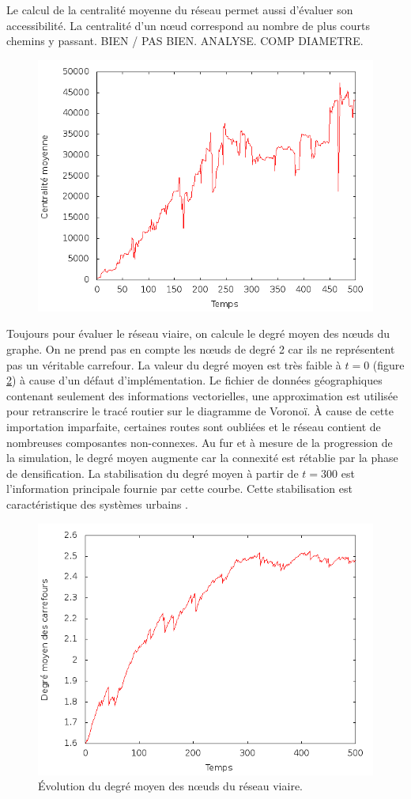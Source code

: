 \documentclass[10pt]{article}
\begin{document}
Le calcul de la centralité moyenne du réseau permet aussi d'évaluer
son accessibilité. La centralité d'un n\oe ud correspond au nombre de
plus courts chemins y passant. BIEN / PAS BIEN. ANALYSE. COMP
DIAMETRE.

\begin{figure}[H]
  \centering
  \includegraphics[width=.8\linewidth]{images/centrality.png}
  \caption{}
    \label{fig:centrality}
\end{figure}

Toujours pour évaluer le réseau viaire, on calcule le degré moyen des
n\oe uds du graphe. On ne prend pas en compte les n\oe uds de degré 2
car ils ne représentent pas un véritable carrefour. La valeur du degré
moyen est très faible à $t = 0$ (figure \ref{fig:degree}) à cause d'un
défaut d'implémentation. Le fichier de données géographiques contenant
seulement des informations vectorielles, une approximation est
utilisée pour retranscrire le tracé routier sur le diagramme de
Voronoï. À cause de cette importation imparfaite, certaines routes
sont oubliées et le réseau contient de nombreuses composantes
non-connexes. Au fur et à mesure de la progression de la simulation,
le degré moyen augmente car la connexité est rétablie par la phase de
densification. La stabilisation du degré moyen à partir de $t = 300$
est l'information principale fournie par cette courbe. Cette
stabilisation est caractéristique des systèmes urbains
\cite{Strano2012}.

\begin{figure}[H]
  \centering
  \includegraphics[width=.8\linewidth]{images/degree.png}
  \caption{Évolution du degré moyen des n\oe uds du réseau viaire.}
    \label{fig:degree}
\end{figure}
\end{document}
